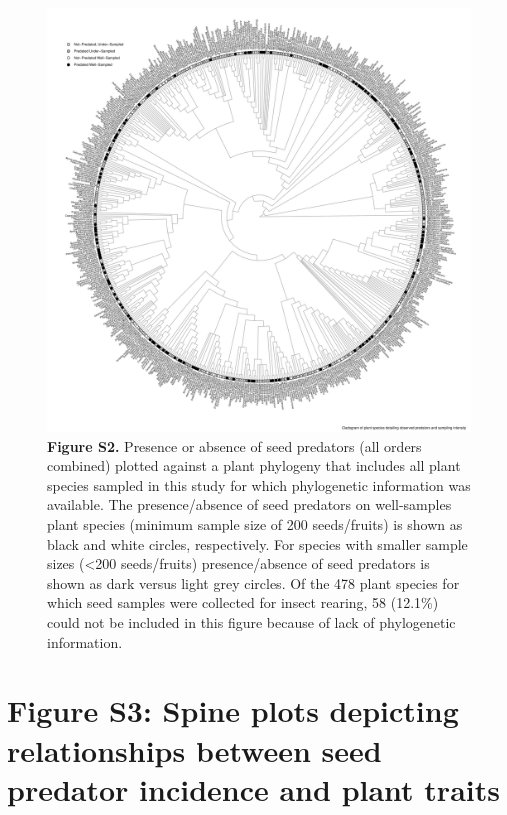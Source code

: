 \documentclass[11pt]{article}
\begin{document}
\begin{figure}[H]
\centering\includegraphics[width=\textwidth]{../Figures/FigureS2all.pdf} 
\caption[]{\textbf{Figure S2.} Presence or absence of seed predators (all orders combined) plotted against a plant phylogeny that includes all plant species sampled in this study for which phylogenetic information was available. The presence/absence of seed predators on well-samples plant species (minimum sample size of 200 seeds/fruits) is shown as black and white circles, respectively. For species with smaller sample sizes (<200 seeds/fruits) presence/absence of seed predators is shown as dark versus light grey circles. Of the 478 plant species for which seed samples were collected for insect rearing, 58 (12.1\%) could not be included in this figure because of lack of phylogenetic information.  }
\end{figure}

\newpage

\section{Figure S3: Spine plots depicting relationships between seed predator incidence and plant traits}
\end{document}
